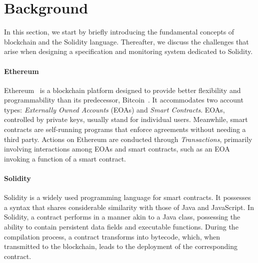\section{Background} 
\label{sec:background}


In this section, we start by briefly introducing the fundamental concepts of blockchain and the Solidity language.
Thereafter, we discuss the challenges that arise when designing a specification and monitoring system dedicated to Solidity.

\paragraph{Ethereum}
Ethereum~\cite{buterin2014next} is a blockchain platform designed to  provide better flexibility and programmability than its predecessor, Bitcoin~\cite{nakamoto2008bitcoin}.
It accommodates two account types: \textit{Externally Owned Accounts} (EOAs) and \textit{Smart Contracts}. 
EOAs, controlled by private keys, usually stand for individual users. 
Meanwhile, smart contracts are self-running programs that enforce agreements without needing a third party.
Actions on Ethereum are conducted through \textit{Transactions}, primarily involving interactions among EOAs and smart contracts, such as an EOA invoking a function of a smart contract.
 
\paragraph{Solidity}
Solidity is a widely used programming language for smart contracts.
It possesses a syntax that shares considerable similarity with those of Java and JavaScript.
In Solidity, a contract performs in a manner akin to a Java class, possessing the ability to contain persistent data fields and executable functions. 
During the compilation process, a contract transforms into bytecode, which, when transmitted to the blockchain, leads to the deployment of the corresponding contract.

